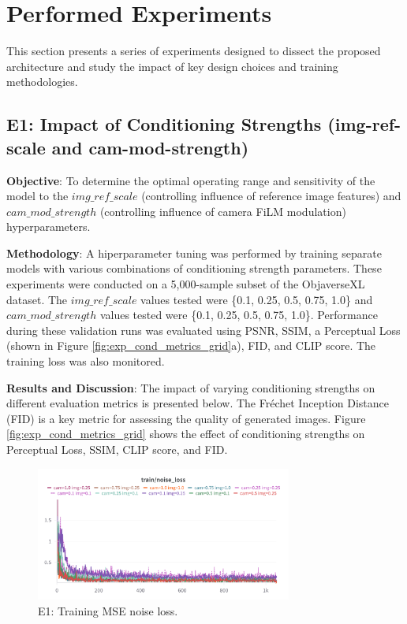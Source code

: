 \section{Performed Experiments}\label{sec:exp_analysis}

This section presents a series of experiments designed to dissect the proposed architecture and study the impact of key design choices and training methodologies.

\subsection{E1: Impact of Conditioning Strengths (img-ref-scale and cam-mod-strength)}\label{ssec:exp_conditioning_strengths}

\textbf{Objective}:
To determine the optimal operating range and sensitivity of the model to the $img\_ref\_scale$ (controlling influence of reference image features) and $cam\_mod\_strength$ (controlling influence of camera FiLM modulation) hyperparameters.

\textbf{Methodology}:
A hiperparameter tuning was performed by training separate models with various combinations of conditioning strength parameters. These experiments were conducted on a 5,000-sample subset of the ObjaverseXL dataset. The $img\_ref\_scale$ values tested were \{0.1, 0.25, 0.5, 0.75, 1.0\} and $cam\_mod\_strength$ values tested were \{0.1, 0.25, 0.5, 0.75, 1.0\}. Performance during these validation runs was evaluated using PSNR, SSIM, a Perceptual Loss (shown in Figure \ref{fig:exp_cond_metrics_grid}a), FID, and CLIP score. The training loss was also monitored.

\textbf{Results and Discussion}:
The impact of varying conditioning strengths on different evaluation metrics is presented below. The Fréchet Inception Distance (FID) is a key metric for assessing the quality of generated images.
Figure \ref{fig:exp_cond_metrics_grid} shows the effect of conditioning strengths on Perceptual Loss, SSIM, CLIP score, and FID.

\begin{figure}[htbp]
  \centering
  \includegraphics[width=0.75\textwidth]{images/experiments/cam_img/train_loss.png}
  \caption{E1: Training MSE noise loss.}
  \label{fig:exp_cond_fid}
\end{figure}


